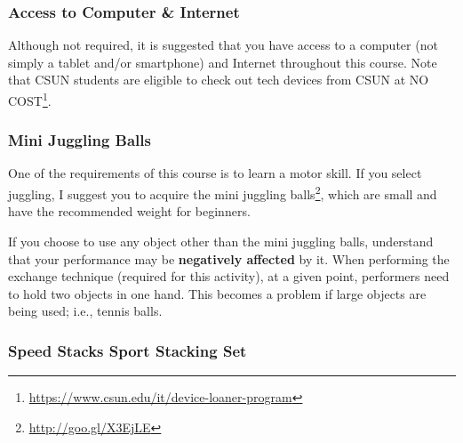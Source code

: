 \documentclass[
  letterpaper,
  DIV=11,
  numbers=noendperiod]{scrartcl}
\DeclareRobustCommand{\href}[2]{#2\footnote{\url{#1}}}
\begin{document}
\hypertarget{access-to-computer-internet}{%
\subsubsection{Access to Computer \&
Internet}\label{access-to-computer-internet}}

Although not required, it is suggested that you have access to a
computer (not simply a tablet and/or smartphone) and Internet throughout
this course. Note that CSUN students are eligible to
\href{https://www.csun.edu/it/device-loaner-program}{check out tech
devices from CSUN at NO COST}.

\hypertarget{mini-juggling-balls}{%
\subsubsection{Mini Juggling Balls}\label{mini-juggling-balls}}

One of the requirements of this course is to learn a motor skill. If you
select juggling, I suggest you to acquire the
\href{http://goo.gl/X3EjLE}{mini juggling balls}, which are small and
have the recommended weight for beginners.

\begin{tcolorbox}[enhanced jigsaw, colbacktitle=quarto-callout-important-color!10!white, rightrule=.15mm, opacityback=0, colframe=quarto-callout-important-color-frame, leftrule=.75mm, breakable, bottomrule=.15mm, arc=.35mm, opacitybacktitle=0.6, title=\textcolor{quarto-callout-important-color}{\faExclamation}\hspace{0.5em}{Important}, titlerule=0mm, toptitle=1mm, bottomtitle=1mm, left=2mm, toprule=.15mm, colback=white, coltitle=black]

If you choose to use any object other than the mini juggling balls,
understand that your performance may be \textbf{negatively affected} by
it. When performing the exchange technique (required for this activity),
at a given point, performers need to hold two objects in one hand. This
becomes a problem if large objects are being used; i.e., tennis balls.

\end{tcolorbox}

\hypertarget{speed-stacks-sport-stacking-set}{%
\subsubsection{Speed Stacks Sport Stacking
Set}\label{speed-stacks-sport-stacking-set}}
\end{document}
